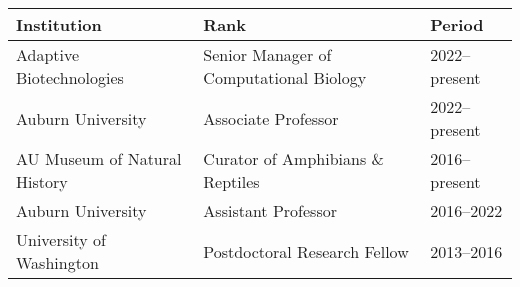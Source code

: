 \noindent\begin{tabulary}{\textwidth}{ @{} l l l @{} }
    \textbf{Institution} & \textbf{Rank} & \textbf{Period} \\
    \hline
    Adaptive Biotechnologies & Senior Manager of Computational Biology & 2022--present \\
    Auburn University & Associate Professor & 2022--present \\
    AU Museum of Natural History & Curator of Amphibians \& Reptiles & 2016--present \\
    Auburn University & Assistant Professor & 2016--2022 \\
    University of Washington & Postdoctoral Research Fellow & 2013--2016 \\
\end{tabulary}

